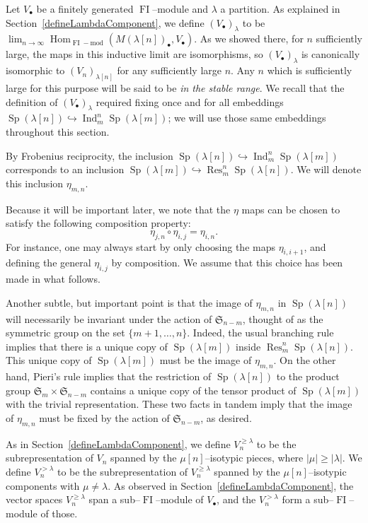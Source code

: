 \documentclass[ALCO,ThmDefs,Unicode,epreuves]{cedram}
\DeclareMathOperator{\FI}{FI}
\DeclareMathOperator{\Hom}{Hom}
\DeclareMathOperator{\Res}{Res}
\DeclareMathOperator{\Ind}{Ind}
\DeclareMathOperator{\Sp}{Sp}
\newcommand{\Sn}{\mathfrak{S}}
\newcommand{\dt}{\bullet}
\newcommand{\into}{\hookrightarrow}
\begin{document}
Let $V_{\bullet}$ be a finitely generated $\FI$--module and $\lambda$ a partition. As explained in Section~\ref{defineLambdaComponent}, we define $(V_\bullet)_{\lambda}$ to be $\lim_{n \to \infty} \Hom_{\FI-\text{mod}}(M(\lambda[n])_\bullet, V_{\bullet})$. As we showed there, for $n$ sufficiently large, the maps in this inductive limit are isomorphisms, so $(V_\dt)_{\lambda}$ is canonically isomorphic to $(V_n)_{\lambda[n]}$ for any sufficiently large $n$. Any $n$ which is sufficiently large for this purpose will be said to be \emph{in the stable range}. We recall that the definition of $(V_\dt)_{\lambda}$ required fixing once and for all embeddings $\Sp(\lambda[n]) \into \Ind_m^{n} \Sp(\lambda[m])$; we will use those same embeddings throughout this section.

By Frobenius reciprocity, the inclusion $\Sp(\lambda[n]) \into \Ind_m^{n} \Sp(\lambda[m])$ corresponds to an inclusion $\Sp(\lambda[m]) \into \Res^n_m \Sp(\lambda[n])$. We will denote this inclusion $\eta_{m,n}$. 

\begin{remark}\label{subtle}
Because it will be important later, we note that the $\eta$ maps can be chosen to satisfy the following composition property:
\[
\eta_{j,n} \circ \eta_{i,j} = \eta_{i,n}.
\]
For instance, one may always start by only choosing the maps $\eta_{i,i+1}$, and defining the general $\eta_{i,j}$ by composition. We assume that this choice has been made in what follows.

Another subtle, but important point is that the image of $\eta_{m,n}$ in $\Sp(\lambda[n])$ will necessarily be invariant under the action of $\Sn_{n-m}$, thought of as the symmetric group on the set $\{m+1,\ldots,n\}$. Indeed, the usual branching rule implies that there is a unique copy of $\Sp(\lambda[m])$ inside $\Res_m^n \Sp(\lambda[n])$. This unique copy of $\Sp(\lambda[m])$ must be the image of $\eta_{m,n}$. On the other hand, Pieri's rule implies that the restriction of $\Sp(\lambda[n])$ to the product group $\Sn_m \times \Sn_{n-m}$ contains a unique copy of the tensor product of $\Sp(\lambda[m])$ with the trivial representation. These two facts in tandem imply that the image of $\eta_{m,n}$ must be fixed by the action of $\Sn_{n-m}$, as desired.
\end{remark}

As in Section~\ref{defineLambdaComponent}, we define $V^{\geq \lambda}_n$ to be the subrepresentation of $V_n$ spanned by the $\mu[n]$--isotypic pieces, where $|\mu| \geq |\lambda|$. We define $V^{> \lambda}_n$ to be the subrepresentation of $V^{\geq \lambda}_n$ spanned by the $\mu[n]$--isotypic components with $\mu \neq \lambda$. As observed in Section~\ref{defineLambdaComponent}, the vector spaces $V^{\geq \lambda}_n$ span a sub--$\FI$--module of $V_{\bullet}$, and the $V^{>\lambda}_n$ form a sub--$\FI$--module of those. 
\end{document}
